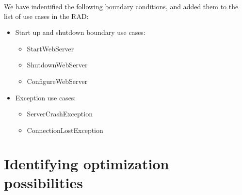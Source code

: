 We have indentified the following boundary conditions, and added them to the list of use cases in the RAD:

\begin{itemize}
	\item Start up and shutdown boundary use cases:
	\begin{itemize}
			\item StartWebServer
			\item ShutdownWebServer
			\item ConfigureWebServer
	\end{itemize}
	\item Exception use cases:
	\begin{itemize}
			\item ServerCrashException
			\item ConnectionLostException
	\end{itemize}
\end{itemize}

\section{Identifying optimization possibilities}